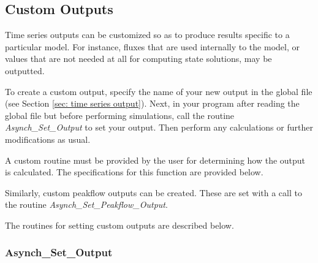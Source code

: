 \documentclass[12pt]{article}
\begin{document}
\subsection{Custom Outputs} \label{sec: custom outputs}

Time series outputs can be customized so as to produce results specific to a particular model. For instance, fluxes that are used internally to the model, or values that are not needed at all for computing state solutions, may be outputted.

To create a custom output, specify the name of your new output in the global file (see Section \ref{sec: time series output}). Next, in your program after reading the global file but before performing simulations, call the routine \emph{Asynch\_Set\_Output} to set your output. Then perform any calculations or further modifications as usual.

A custom routine must be provided by the user for determining how the output is calculated. The specifications for this function are provided below.

Similarly, custom peakflow outputs can be created. These are set with a call to the routine \emph{Asynch\_Set\_Peakflow\_Output}.

The routines for setting custom outputs are described below.


\subsubsection{Asynch\_Set\_Output} \label{sec: asynch_set_output}
\end{document}
